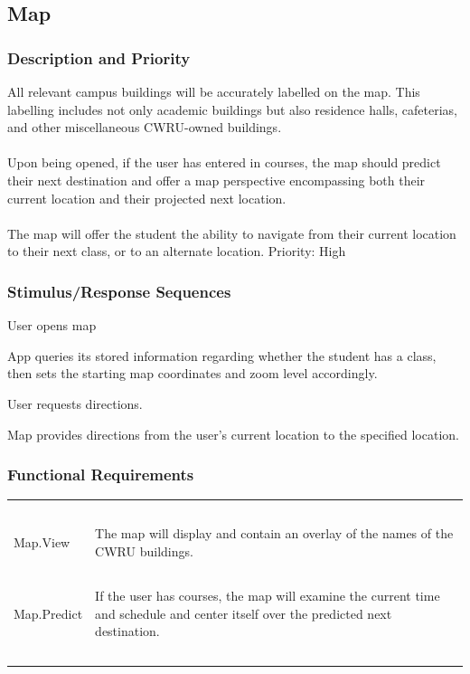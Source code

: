 \documentclass[pdftex,12pt,letter]{article}
\begin{document}
\subsection{Map}
\subsubsection{Description and Priority}
All relevant campus buildings will be accurately labelled on the map. This labelling includes not only academic buildings but also residence halls, cafeterias, and other miscellaneous CWRU-owned buildings.\\\\
Upon being opened, if the user has entered in courses, the map should predict their next destination and offer a map perspective encompassing both their current location and their projected next location.\\\\
The map will offer the student the ability to navigate from their current location to their next class, or to an alternate location. Priority: High
\subsubsection{Stimulus/Response Sequences}
\begin{description}\itemsep1pt
\item[Stimulus:] User opens map
\item[Response:] App queries its stored information regarding whether the student has a class, then sets the starting map coordinates and zoom level accordingly.
\item[Stimulus:] User requests directions.
\item[Response:] Map provides directions from the user's current location to the specified location.
\end{description}
\subsubsection{Functional Requirements}
\begin{table}[!h]
\begin{tabularx}{\textwidth }[t]{|l Y|}
\hline
~&~\\
Map.View & The map will display and contain an overlay of the names of the CWRU buildings. \\ 
~&~\\
Map.Predict & If the user has courses, the map will examine the current time and schedule and center itself over the predicted next destination. \\
~&~\\
\hline
\end{tabularx}
\end{table}
\end{document}

